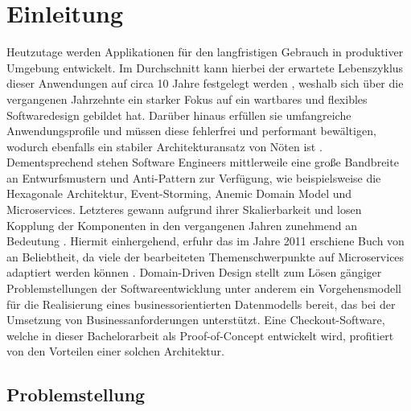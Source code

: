 

\chapter{Einleitung}

Heutzutage werden Applikationen für den langfristigen Gebrauch in produktiver Umgebung entwickelt. Im Durchschnitt kann hierbei der erwartete Lebenszyklus dieser Anwendungen auf circa 10 Jahre festgelegt werden \cite{Tamai.1992}, weshalb sich über die vergangenen Jahrzehnte ein starker Fokus auf ein wartbares und flexibles Softwaredesign gebildet hat. Darüber hinaus erfüllen sie umfangreiche Anwendungsprofile und müssen diese fehlerfrei und performant bewältigen, wodurch ebenfalls ein stabiler Architekturansatz von Nöten ist \cite{Bosch.2001}. Dementsprechend stehen Software Engineers mittlerweile eine große Bandbreite an Entwurfsmustern und Anti-Pattern zur Verfügung, wie beispielsweise die Hexagonale Architektur, Event-Storming, \Gls{Anemic Domain Model} und Microservices. Letzteres gewann aufgrund ihrer Skalierbarkeit und losen Kopplung der Komponenten in den vergangenen Jahren zunehmend an Bedeutung \cite{oreilly.Microservices, Sampaio.2017}. Hiermit einhergehend, erfuhr das im Jahre 2011 erschiene Buch  von \citeauthor{Evans.2011} an Beliebtheit, da viele der bearbeiteten Themenschwerpunkte auf Microservices adaptiert werden können \cite[S. 130ff.]{Vernon.2015}\cite{Microservice.DDD.2017}. Domain-Driven Design stellt zum Lösen gängiger Problemstellungen der Softwareentwicklung unter anderem ein Vorgehensmodell für die Realisierung eines businessorientierten Datenmodells bereit, das bei der Umsetzung von Businessanforderungen unterstützt. Eine Checkout-Software, welche in dieser Bachelorarbeit als Proof-of-Concept entwickelt wird, profitiert von den Vorteilen einer solchen Architektur. 

\section{Problemstellung}

